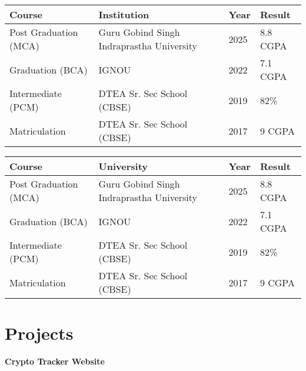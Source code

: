\documentclass[10pt, letterpaper]{article}
\newenvironment{twocolentry}[2][]{
    \onecolentry
    \def\secondColumn{#2}
    \setcolumnwidth{\fill, 4.5 cm}
    \begin{paracol}{2}
}{
    \switchcolumn \raggedleft \secondColumn
    \end{paracol}
    \endonecolentry
} %
\let\hrefWithoutArrow\href
\renewcommand{\href}[2]{\hrefWithoutArrow{#1}{\ifthenelse{\equal{#2}{}}{ }{#2 }\raisebox{.15ex}{\footnotesize \faExternalLink*}}}
\begin{document}
\begin{table}[h!]
    \centering
    \renewcommand{\arraystretch}{1.4} %
    \setlength{\tabcolsep}{12pt} %
    \begin{tabular}{|p{3.8cm}|p{6.7cm}|p{1cm}|p{2.5cm}|}
        \hline
        \textbf{Course} & \textbf{Institution} & \textbf{Year} & \textbf{Result} \\ \hline
        Post Graduation (MCA) & Guru Gobind Singh Indraprastha University & 2025 & 8.8 CGPA \\ \hline
        Graduation (BCA) & IGNOU & 2022 & 7.1 CGPA \\ \hline
        Intermediate (PCM) & DTEA Sr. Sec School (CBSE) & 2019 & 82\% \\ \hline
        Matriculation & DTEA Sr. Sec School (CBSE) & 2017 & 9 CGPA \\ \hline
    \end{tabular}


\begin{table}[h!]
    \centering
    \renewcommand{\arraystretch}{1.4} %
    \setlength{\tabcolsep}{12pt} %
    \begin{tabular}{|p{3.8cm}|p{6.7cm}|p{1cm}|p{2.5cm}|}
        \hline
        \textbf{Course} & \textbf{University} & \textbf{Year} & \textbf{Result} \\ \hline
        Post Graduation (MCA) & Guru Gobind Singh Indraprastha University & 2025 & 8.8 CGPA \\ \hline
        Graduation (BCA) & IGNOU & 2022 & 7.1 CGPA \\ \hline
        Intermediate (PCM) & DTEA Sr. Sec School (CBSE) & 2019 & 82\% \\ \hline
        Matriculation & DTEA Sr. Sec School (CBSE) & 2017 & 9 CGPA \\ \hline
    \end{tabular}
\end{table}
\end{table}

\vspace{-0.40 cm}

\section{Projects}

        
        \begin{twocolentry}{
    \textit{\href{https://github.com/ssganesh035/Crypto-Tracker}{Github}}}
    \textbf{Crypto Tracker Website} 
\end{twocolentry}
\end{document}
